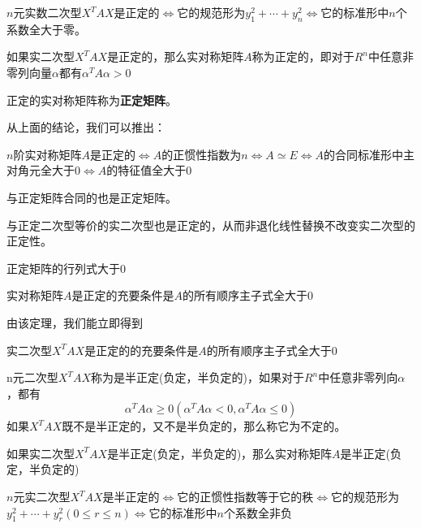 \documentclass[lang=cn,10pt]{elegantbook}
\begin{document}
\begin{corollary}
		$n$元实数二次型$X^{T}AX$是正定的$\Longleftrightarrow $它的规范形为$y^{2}_{1}+\cdots+y^{2}_{n}$$\Longleftrightarrow $它的标准形中$n$个系数全大于零。
\end{corollary}
\begin{definition}
	如果实二次型$X^{T}AX$是正定的，那么实对称矩阵$A$称为正定的，即对于$R^{n}$中任意非零列向量$\alpha$都有$\alpha^{T}A\alpha>0$
\end{definition}
正定的实对称矩阵称为\textbf{正定矩阵}。

从上面的结论，我们可以推出：

\begin{theorem}
	$n$阶实对称矩阵$A$是正定的$\Longleftrightarrow $$A$的正惯性指数为$n$$\Longleftrightarrow $$A\simeq E$$\Longleftrightarrow $$A$的合同标准形中主对角元全大于0$\Longleftrightarrow $$A$的特征值全大于0
\end{theorem}
\begin{corollary}
	与正定矩阵合同的也是正定矩阵。
\end{corollary}
\begin{corollary}
	与正定二次型等价的实二次型也是正定的，从而非退化线性替换不改变实二次型的正定性。
\end{corollary}
\begin{corollary}
	正定矩阵的行列式大于0
\end{corollary}
\begin{theorem}
	实对称矩阵$A$是正定的充要条件是$A$的所有顺序主子式全大于0
\end{theorem}
由该定理，我们能立即得到
\begin{corollary}
	实二次型$X^{T}AX$是正定的的充要条件是$A$的所有顺序主子式全大于0
\end{corollary}
\begin{definition}
	n元二次型$X^{T}AX$称为是半正定(负定，半负定的)，如果对于$R^{n}$中任意非零列向$\alpha$，都有
	\begin{equation*}
		\alpha^{T}A\alpha\ge0 (\alpha^{T}A\alpha<0,\alpha^{T}A\alpha\le 0)
	\end{equation*}
	如果$X^{T}AX$既不是半正定的，又不是半负定的，那么称它为不定的。
\end{definition}
\begin{definition}
	如果实二次型$X^{T}AX$是半正定(负定，半负定的)，那么实对称矩阵$A$是半正定(负定，半负定的)
\end{definition}
\begin{theorem}
	$n$元实二次型$X^{T}AX$是半正定的$\Longleftrightarrow $它的正惯性指数等于它的秩$\Longleftrightarrow$它的规范形为$y^{2}_{1}+\cdots+y^{2}_{r}(0\le r \le n)$$\Longleftrightarrow$它的标准形中$n$个系数全非负
\end{theorem}
\end{document}
